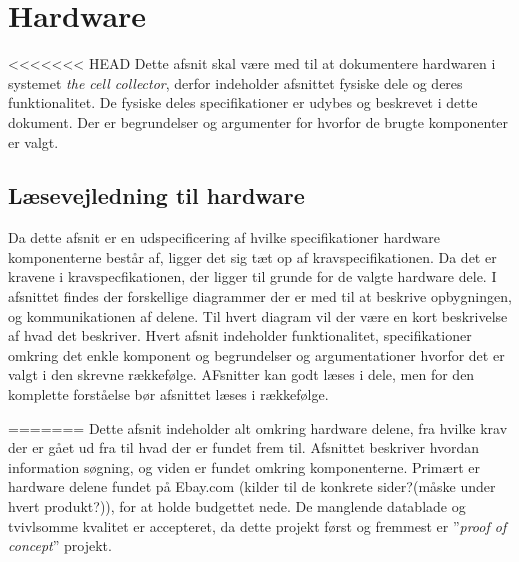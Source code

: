  \section{Hardware}
<<<<<<< HEAD
Dette afsnit skal være med til at dokumentere hardwaren i systemet \textit{the cell collector}, derfor indeholder afsnittet fysiske dele og deres funktionalitet. De fysiske deles specifikationer er udybes og beskrevet i dette dokument. Der er begrundelser og argumenter for hvorfor de brugte komponenter er valgt.

\subsection{Læsevejledning til hardware}
Da dette afsnit er en udspecificering af hvilke specifikationer hardware komponenterne består af, ligger det sig tæt op af kravspecifikationen. Da det er kravene i kravspecfikationen, der ligger til grunde for de valgte hardware dele. I afsnittet findes der forskellige diagrammer der er med til at beskrive opbygningen, og kommunikationen af delene. Til hvert diagram vil der være en kort beskrivelse af hvad det beskriver. Hvert afsnit indeholder funktionalitet, specifikationer omkring det enkle komponent og begrundelser og argumentationer hvorfor det er valgt i den skrevne rækkefølge. AFsnitter kan godt læses i dele, men for den komplette forståelse bør afsnittet læses i rækkefølge. 

 
 
 
=======
 Dette afsnit indeholder alt omkring hardware delene, fra hvilke krav der er gået ud fra til hvad der er fundet frem til.  Afsnittet beskriver hvordan information søgning, og viden er fundet omkring komponenterne. Primært er hardware delene  fundet på Ebay.com (kilder til de konkrete sider?(måske under hvert produkt?)), for at holde budgettet nede. De manglende datablade og tvivlsomme kvalitet er accepteret, da dette projekt først og fremmest er  ”\textit{proof of concept}” projekt.

